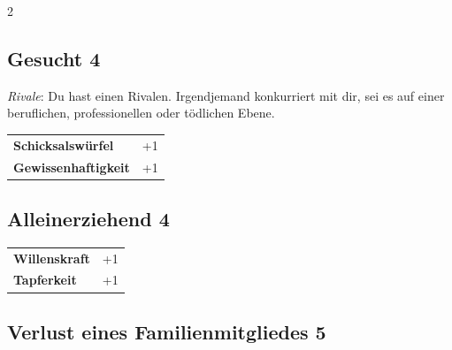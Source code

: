\begin{multicols}{2}
\begin{tcolorbox}

\end{tcolorbox}

\begin{tcolorbox}
    \subsection*{Gesucht \hfill \small{4 }}
    \tcblower
\textit{Rivale}: Du hast einen Rivalen. Irgendjemand konkurriert mit dir, sei es auf einer beruflichen, professionellen oder tödlichen Ebene.


\vspace{3mm}

\begin{tabular}{@{}ll@{}}
    \textbf{Schicksalswürfel} & +1\\
    \textbf{Gewissenhaftigkeit} & +1\\
\end{tabular}


\end{tcolorbox}

\begin{tcolorbox}
    \subsection*{Alleinerziehend \hfill \small{4 }}
    \tcblower




\begin{tabular}{@{}ll@{}}
    \textbf{Willenskraft} & +1\\
    \textbf{Tapferkeit} & +1\\
\end{tabular}


\end{tcolorbox}

\begin{tcolorbox}
    \subsection*{Verlust eines Familienmitgliedes \hfill \small{5 }}
    \tcblower





\end{tcolorbox}
\end{multicols}
